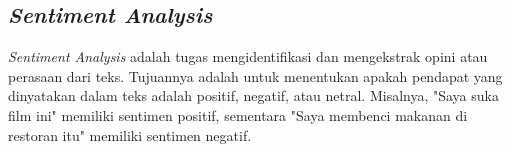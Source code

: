 \subsection{\textit{Sentiment Analysis}}

\textit{Sentiment Analysis} adalah tugas mengidentifikasi dan mengekstrak opini atau perasaan dari teks. Tujuannya adalah untuk menentukan apakah pendapat yang dinyatakan dalam teks adalah positif, negatif, atau netral. Misalnya, "Saya suka film ini" memiliki sentimen positif, sementara "Saya membenci makanan di restoran itu" memiliki sentimen negatif.